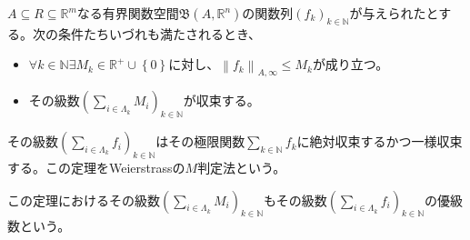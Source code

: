 \documentclass[dvipdfmx]{jsarticle}
\begin{document}
\begin{thm}\label{4.1.11.17}
$A \subseteq R \subseteq \mathbb{R}^{m}$なる有界関数空間$\mathfrak{B}\left( A,\mathbb{R}^{n} \right)$の関数列$\left( f_{k} \right)_{k \in \mathbb{N}}$が与えられたとする。次の条件たちいづれも満たされるとき、
\begin{itemize}
\item
  $\forall k \in \mathbb{N}\exists M_{k} \in \mathbb{R}^{+} \cup \left\{ 0 \right\}$に対し、$\left\| f_{k} \right\|_{A,\infty} \leq M_{k}$が成り立つ。
\item
  その級数$\left( \sum_{i \in \varLambda_{k}} M_{i} \right)_{k \in \mathbb{N}}$が収束する。
\end{itemize}
その級数$\left( \sum_{i \in \varLambda_{k}} f_{i} \right)_{k \in \mathbb{N}}$はその極限関数$\sum_{k \in \mathbb{N}} f_{k}$に絶対収束するかつ一様収束する。この定理をWeierstrassの$M$判定法という。\par
この定理におけるその級数$\left( \sum_{i \in \varLambda_{k}} M_{i} \right)_{k \in \mathbb{N}}$もその級数$\left( \sum_{i \in \varLambda_{k}} f_{i} \right)_{k \in \mathbb{N}}$の優級数という。
\end{thm}
\end{document}
